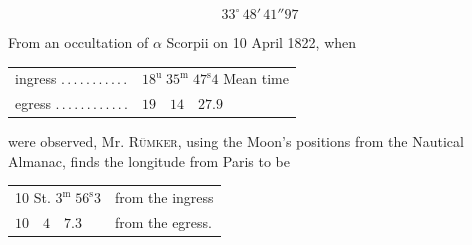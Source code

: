 \[
33^{\circ}\,48'\,41''97
\]

From an occultation of $\alpha$ Scorpii on 10 April 1822, when

% 
\begin{center}
\small
\begin{tabular}{l l}
ingress \mbox{.\,.\,.\,.\,.\,.\,.\,.\,.\,.\,.} & $18^{\mathrm{u}}\;35^{\mathrm{m}}\;47^{\mathrm{s}}4$ Mean time \\
egress \mbox{.\,.\,.\,.\,.\,.\,.\,.\,.\,.\,.\,.} & $19\quad14\quad27.9$
\end{tabular}
\end{center}

\noindent were observed, Mr. \textsc{Rümker}, using the Moon’s positions from the Nautical Almanac, finds the longitude from Paris to be
\begin{center}
\begin{tabular}{l l}
10 St. $3^{\mathrm{m}}\;56^{\mathrm{s}}3$ & from the ingress \\
$10\quad4\quad7.3$ & from the egress.
\end{tabular}
\end{center}
